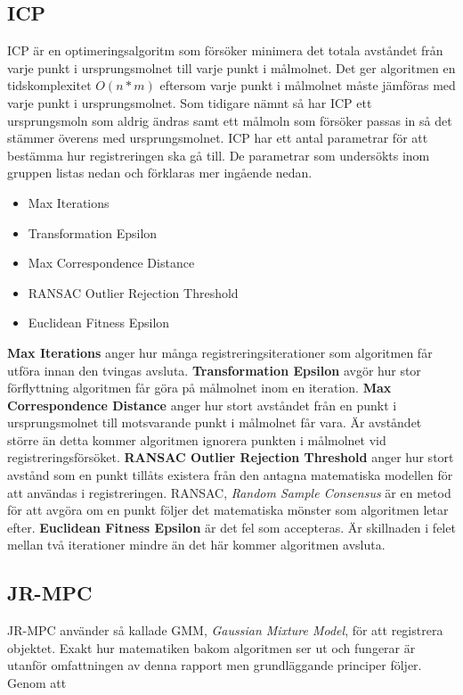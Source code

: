 \subsection{ICP}
ICP är en optimeringsalgoritm som försöker minimera det totala avståndet från varje punkt i ursprungsmolnet till varje punkt i målmolnet. Det ger algoritmen en tidskomplexitet $ \mathit{O(n*m)} $ eftersom varje punkt i målmolnet måste jämföras med varje punkt i ursprungsmolnet. Som tidigare nämnt så har ICP ett ursprungsmoln som aldrig ändras samt ett målmoln som försöker passas in så det stämmer överens med ursprungsmolnet. ICP har ett antal parametrar för att bestämma hur registreringen ska gå till. De parametrar som undersökts inom gruppen listas nedan och förklaras mer ingående nedan.
\begin{itemize}
	\item Max Iterations
	\item Transformation Epsilon
	\item Max Correspondence Distance
	\item RANSAC Outlier Rejection Threshold
	\item Euclidean Fitness Epsilon
\end{itemize}
\textbf{Max Iterations} anger hur många registreringsiterationer som algoritmen får utföra innan den tvingas avsluta.\newline
\textbf{Transformation Epsilon} avgör hur stor förflyttning algoritmen får göra på målmolnet inom en iteration.\newline
\textbf{Max Correspondence Distance} anger hur stort avståndet från en punkt i ursprungsmolnet till motsvarande punkt i målmolnet får vara. Är avståndet större än detta kommer algoritmen ignorera punkten i målmolnet vid registreringsförsöket.\newline
\textbf{RANSAC Outlier Rejection Threshold} anger hur stort avstånd som en punkt tillåts existera från den antagna matematiska modellen för att användas i registreringen. RANSAC, \textit{Random Sample Consensus} är en metod för att avgöra om en punkt följer det matematiska mönster som algoritmen letar efter.\newline
\textbf{Euclidean Fitness Epsilon} är det fel som accepteras. Är skillnaden i felet mellan två iterationer mindre än det här kommer algoritmen avsluta.\newline


\subsection{JR-MPC}
JR-MPC använder så kallade GMM, \textit{Gaussian Mixture Model}, för att registrera objektet. Exakt hur matematiken bakom algoritmen ser ut och fungerar är utanför omfattningen av denna rapport men grundläggande principer följer. Genom att 

